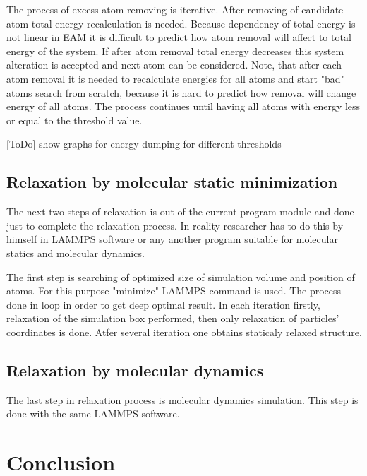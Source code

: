 \documentclass[12pt]{report}
\begin{document}
The process of excess atom removing is iterative. After removing of candidate atom total energy recalculation is needed. Because dependency of total energy is not linear in EAM it is difficult to predict how atom removal will affect to total energy of the system. If after atom removal total energy decreases this system alteration is accepted and next atom can be considered. Note, that after each atom removal it is needed to recalculate energies for all atoms and start "bad" atoms search from scratch, because it is hard to predict how removal will change energy of all atoms. The process continues until having all atoms with energy less or equal to the threshold value.


[ToDo] show graphs for energy dumping for different thresholds

\subsection{Relaxation by molecular static minimization}

The next two steps of relaxation is out of the current program module and done just to complete the relaxation process. In reality researcher has to do this by himself in LAMMPS software or any another program suitable for molecular statics and molecular dynamics.

The first step is searching of optimized size of simulation volume and position of atoms. For this purpose "minimize" LAMMPS command is used. The process done in loop in order to get deep optimal result. In each iteration firstly, relaxation of the simulation box performed, then only relaxation of particles' coordinates is done. Atfer several iteration one obtains staticaly relaxed structure.

\subsection{Relaxation by molecular dynamics}

The last step in relaxation process is molecular dynamics simulation. This step is done with the same LAMMPS software. 

\section{Conclusion}
\end{document}
